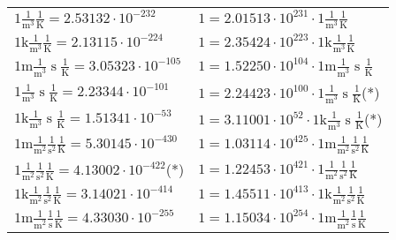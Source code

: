 \begin{center}
\begin{longtable}{l l}
{\color{black}$1 \bm{\mathrm{ }}\frac1{\operatorname{m}^3}{}{}\frac1{\operatorname{K}} = 2.53132\cdot10^{-232} $}   & {\color{black}$ 1 = 2.01513\cdot10^{231} \cdot 1 \bm{\mathrm{ }}\frac1{\operatorname{m}^3}{}{}\frac1{\operatorname{K}}$}  \\
{\color{gray}$1 \bm{\mathrm{ k}}\frac1{\operatorname{m}^3}{}{}\frac1{\operatorname{K}} = 2.13115\cdot10^{-224} $}   & {\color{gray}$ 1 = 2.35424\cdot10^{223} \cdot 1 \bm{\mathrm{ k}}\frac1{\operatorname{m}^3}{}{}\frac1{\operatorname{K}}$}  \\
{\color{gray}$1 \bm{\mathrm{ m}}\frac1{\operatorname{m}^3}{\operatorname{s}}{}\frac1{\operatorname{K}} = 3.05323\cdot10^{-105} $}   & {\color{gray}$ 1 = 1.52250\cdot10^{104} \cdot 1 \bm{\mathrm{ m}}\frac1{\operatorname{m}^3}{\operatorname{s}}{}\frac1{\operatorname{K}}$}  \\
{\color{black}$1 \bm{\mathrm{ }}\frac1{\operatorname{m}^3}{\operatorname{s}}{}\frac1{\operatorname{K}} = 2.23344\cdot10^{-101} $}   & {\color{black}$ 1 = 2.24423\cdot10^{100} \cdot 1 \bm{\mathrm{ }}\frac1{\operatorname{m}^3}{\operatorname{s}}{}\frac1{\operatorname{K}}$}\quad(*)\\
{\color{gray}$1 \bm{\mathrm{ k}}\frac1{\operatorname{m}^3}{\operatorname{s}}{}\frac1{\operatorname{K}} = 1.51341\cdot10^{-53} $}   & {\color{gray}$ 1 = 3.11001\cdot10^{52} \cdot 1 \bm{\mathrm{ k}}\frac1{\operatorname{m}^3}{\operatorname{s}}{}\frac1{\operatorname{K}}$}\quad(*)\\
{\color{gray}$1 \bm{\mathrm{ m}}\frac1{\operatorname{m}^2}\frac1{\operatorname{s}^2}{}\frac1{\operatorname{K}} = 5.30145\cdot10^{-430} $}   & {\color{gray}$ 1 = 1.03114\cdot10^{425} \cdot 1 \bm{\mathrm{ m}}\frac1{\operatorname{m}^2}\frac1{\operatorname{s}^2}{}\frac1{\operatorname{K}}$}  \\
{\color{black}$1 \bm{\mathrm{ }}\frac1{\operatorname{m}^2}\frac1{\operatorname{s}^2}{}\frac1{\operatorname{K}} = 4.13002\cdot10^{-422} $}\quad(*) & {\color{black}$ 1 = 1.22453\cdot10^{421} \cdot 1 \bm{\mathrm{ }}\frac1{\operatorname{m}^2}\frac1{\operatorname{s}^2}{}\frac1{\operatorname{K}}$}  \\
{\color{gray}$1 \bm{\mathrm{ k}}\frac1{\operatorname{m}^2}\frac1{\operatorname{s}^2}{}\frac1{\operatorname{K}} = 3.14021\cdot10^{-414} $}   & {\color{gray}$ 1 = 1.45511\cdot10^{413} \cdot 1 \bm{\mathrm{ k}}\frac1{\operatorname{m}^2}\frac1{\operatorname{s}^2}{}\frac1{\operatorname{K}}$}  \\
{\color{gray}$1 \bm{\mathrm{ m}}\frac1{\operatorname{m}^2}\frac1{\operatorname{s}}{}\frac1{\operatorname{K}} = 4.33030\cdot10^{-255} $}   & {\color{gray}$ 1 = 1.15034\cdot10^{254} \cdot 1 \bm{\mathrm{ m}}\frac1{\operatorname{m}^2}\frac1{\operatorname{s}}{}\frac1{\operatorname{K}}$}  \\

\end{longtable}
\end{center}
